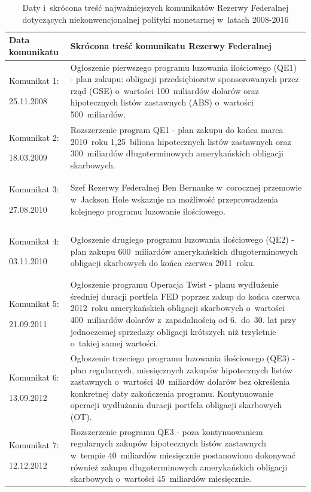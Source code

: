 \hypertarget{tab2}{}
\begin{table}[H]
\captionsetup{format=hang, position=top}
\caption{Daty i~skrócona treść najważniejszych komunikatów Rezerwy Federalnej dotyczących niekonwencjonalnej polityki monetarnej  w~latach 2008-2016}
\begin{tabular}{M{2.75cm}M{12.5cm}}
\toprule
\textbf{Data komunikatu} & \textbf{Skrócona treść komunikatu Rezerwy Federalnej}\\
\midrule
\hypertarget{kom1}{Komunikat 1:} 25.11.2008 & Ogłoszenie pierwszego programu luzowania ilościowego (\acs{QE}1) - plan zakupu: obligacji przedsiębiorstw sponsorowanych przez rząd (\acs{GSE}) o~wartości 100~miliardów dolarów oraz hipotecznych listów zastawnych (\acs{ABS}) o~wartości 500~miliardów.\cite{Fed09}   \\
\hypertarget{kom2}{Komunikat 2:} 18.03.2009 & Rozszerzenie program \acs{QE}1 - plan zakupu do końca marca 2010~roku 1,25~biliona hipotecznych listów zastawnych oraz 300~miliardów długoterminowych amerykańskich obligacji skarbowych.\cite{Fed10} \\
\hypertarget{kom3}{Komunikat 3:} 27.08.2010 & Szef Rezerwy Federalnej Ben Bernanke w~corocznej przemowie w~Jackson Hole wskazuje na możliwość przeprowadzenia kolejnego programu luzowanie ilościowego.\cite{bernanke11}\\
\hypertarget{kom4}{Komunikat 4:} 03.11.2010 & Ogłoszenie drugiego programu luzowania ilościowego (\acs{QE}2) - plan zakupu 600~miliardów amerykańskich długoterminowych obligacji skarbowych do końca czerwca 2011~roku.\cite{Fed12} \\
\hypertarget{kom5}{Komunikat 5:} 21.09.2011 & Ogłoszenie programu Operacja Twist - planu wydłużenie średniej duracji portfela \acs{FED} poprzez zakup do końca czerwca 2012~roku amerykańskich obligacji skarbowych o~wartości 400~miliardów dolarów z~zapadalnością od 6.~do~30. lat przy jednoczesnej sprzedaży obligacji krótszych niż trzyletnie o~takiej samej wartości.\cite{Fed13} \\
\hypertarget{kom6}{Komunikat 6:} 13.09.2012 & Ogłoszenie trzeciego programu luzowania ilościowego (\acs{QE}3) - plan regularnych, miesięcznych zakupów hipotecznych listów zastawnych o~wartości 40~miliardów dolarów bez określenia konkretnej daty zakończenia programu. Kontynuowanie operacji wydłużania duracji portfela obligacji skarbowych (\acs{OT}).\cite{Fed14}\\
\hypertarget{kom7}{Komunikat 7:} 12.12.2012 & Rozszerzenie programu \acs{QE}3 - poza kontynuowaniem regularnych zakupów hipotecznych listów zastawnych w~tempie 40~miliardów miesięcznie postanowiono dokonywać również zakupu długoterminowych amerykańskich obligacji skarbowych o~wartości 45~miliardów miesięcznie.\cite{Fed15}\\

\end{tabular}
\end{table}
